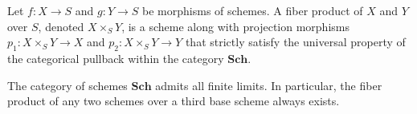 \begin{definition}
Let $f: X \to S$ and $g: Y \to S$ be morphisms of schemes. A fiber product of $X$ and $Y$ over $S$, denoted $X \times_S Y$, is a scheme along with projection morphisms $p_1: X \times_S Y \to X$ and $p_2: X \times_S Y \to Y$ that strictly satisfy the universal property of the categorical pullback within the category $\mathbf{Sch}$.
\end{definition}

\begin{theorem}
The category of schemes $\mathbf{Sch}$ admits all finite limits. In particular, the fiber product of any two schemes over a third base scheme always exists.
\end{theorem}

